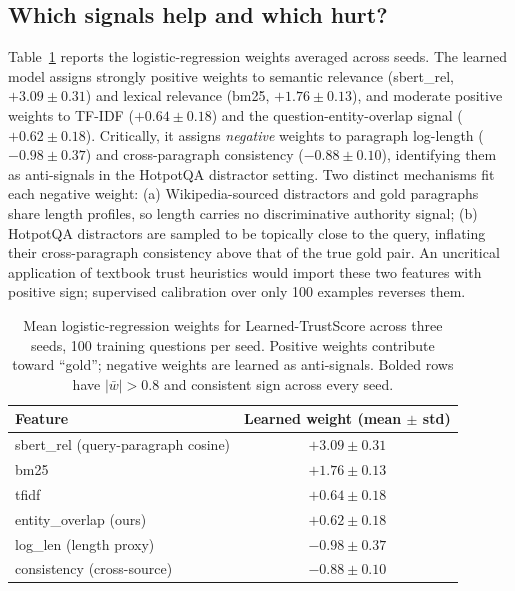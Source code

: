 \subsection*{Which signals help and which hurt?}

Table~\ref{tab:weights} reports the logistic-regression weights averaged
across seeds. The learned model assigns strongly positive weights to
semantic relevance (sbert\_rel, $+3.09 \pm 0.31$) and lexical relevance
(bm25, $+1.76 \pm 0.13$), and moderate positive weights to TF-IDF
($+0.64 \pm 0.18$) and the question-entity-overlap signal
($+0.62 \pm 0.18$). Critically, it assigns \emph{negative} weights to
paragraph log-length ($-0.98 \pm 0.37$) and cross-paragraph consistency
($-0.88 \pm 0.10$), identifying them as anti-signals in the HotpotQA
distractor setting. Two distinct mechanisms fit each negative weight:
(a) Wikipedia-sourced distractors and gold paragraphs share length
profiles, so length carries no discriminative authority signal; (b)
HotpotQA distractors are sampled to be topically close to the query,
inflating their cross-paragraph consistency above that of the true gold
pair. An uncritical application of textbook trust heuristics would
import these two features with positive sign; supervised calibration
over only 100 examples reverses them.

\begin{table}[t]
\centering
\small
\begin{tabular}{lc}
\toprule
Feature & Learned weight (mean $\pm$ std) \\
\midrule
sbert\_rel (query-paragraph cosine) & $\mathbf{+3.09 \pm 0.31}$ \\
bm25                                & $\mathbf{+1.76 \pm 0.13}$ \\
tfidf                               & $+0.64 \pm 0.18$ \\
entity\_overlap (ours)              & $+0.62 \pm 0.18$ \\
log\_len (length proxy)             & $\mathbf{-0.98 \pm 0.37}$ \\
consistency (cross-source)          & $\mathbf{-0.88 \pm 0.10}$ \\
\bottomrule
\end{tabular}
\caption{Mean logistic-regression weights for Learned-TrustScore across three seeds, 100 training questions per seed. Positive weights contribute toward ``gold''; negative weights are learned as anti-signals. Bolded rows have $|\bar w| > 0.8$ and consistent sign across every seed.}
\label{tab:weights}
\end{table}

